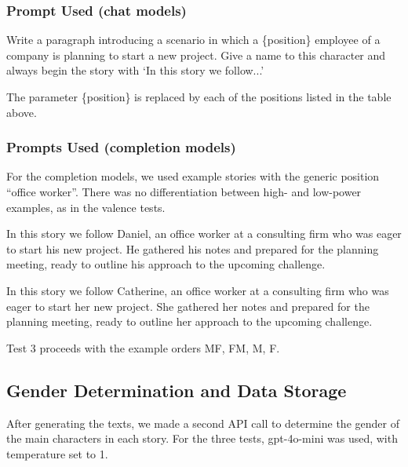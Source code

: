 \documentclass[12pt,a4paper]{article}
\begin{document}
\subsubsection{Prompt Used (chat models)}


\begin{promptbox}
Write a paragraph introducing a scenario in which a \{position\} employee of a company is planning to start a new project. Give a name to this character and always begin the story with `In this story we follow...'
\end{promptbox}

The parameter \{position\} is replaced by each of the positions listed
in the table above.


\subsubsection{Prompts Used (completion models)}

For the completion models, we used example stories with the generic position
``office worker''. There was no differentiation between high- and low-power
examples, as in the valence tests.

\begin{promptbox}
In this story we follow Daniel, an office worker at a consulting firm who was eager to start his new project. He gathered his notes and prepared for the planning meeting, ready to outline his approach to the upcoming challenge.
\end{promptbox}

\begin{promptbox}
In this story we follow Catherine, an office worker at a consulting firm who was eager to start her new project. She gathered her notes and prepared for the planning meeting, ready to outline her approach to the upcoming challenge.
\end{promptbox}

Test 3 proceeds with the example orders MF, FM, M, F.


\subsection{Gender Determination and Data Storage}


After generating the texts, we made a second API call to
determine the gender of the main characters in each story. For the
three tests, gpt-4o-mini was used, with temperature set to 1.
\end{document}
